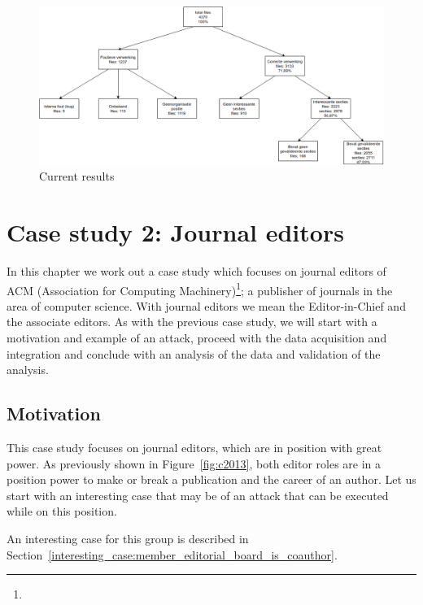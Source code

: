 \documentclass{ou-report}
\begin{document}
\begin{figure}[H]
    \centering
    \includegraphics[width=17cm]{images/lncs_front_matter_result.drawio.png}
    \caption{Current results}
    \label{fig:lncs_pdf_database}
\end{figure}


\chapter{Case study 2: Journal editors}
\label{chp:case2}
In this chapter we work out a case study which focuses on journal editors of 
ACM (Association for Computing Machinery)\footnote{}; 
a publisher of journals in the area of computer science.
With journal editors we mean the Editor-in-Chief and the associate editors.
As with the previous case study, we will start with a motivation and example of
an attack, proceed with the data acquisition and integration and conclude with
an analysis of the data and validation of the analysis.

\section{Motivation}
This case study focuses on journal editors, which are in position with great 
power. As previously shown in Figure~\ref{fig:c2013}, both editor roles are in 
a position power to make or break a publication and the career of an author.
Let us start with an interesting case that may be of an attack that can be 
executed while on this position.

An interesting case for this group is described in 
Section~\ref{interesting_case:member_editorial_board_is_coauthor}.
\end{document}

